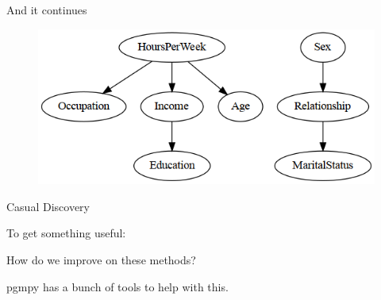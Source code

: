 \documentclass{beamer}
\begin{document}
% 
% 

\begin{frame}{And it continues}
	\begin{figure}
		\centering
		\includegraphics[scale=0.4]{imgs/adult_pillai.png}
	\end{figure}
\end{frame}

\begin{frame}{Casual Discovery}

	To get something useful:
	\begin{itemize}
	\end{itemize}
	How do we improve on these methods?

	pgmpy has a bunch of tools to help with this.

\end{frame}
\end{document}
